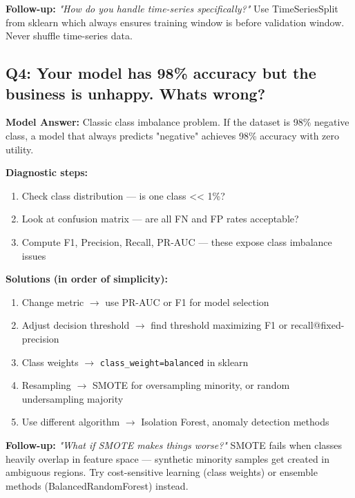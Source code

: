 \documentclass[11pt]{article}
\providecommand{\tightlist}{\setlength{\itemsep}{1pt}\setlength{\parskip}{0pt}}
\begin{document}
\textbf{Follow-up:} \emph{"How do you handle time-series specifically?"}
Use TimeSeriesSplit from sklearn which always ensures training window is before validation window. Never shuffle time-series data.

\subsection{Q4: Your model has 98\% accuracy but the business is unhappy. What\textquotesingle s wrong?}\label{q4-your-model-has-98-accuracy-but-the-business-is-unhappy-whats-wrong}

\textbf{Model Answer:}
Classic class imbalance problem. If the dataset is 98\% negative class, a model that always predicts "negative" achieves 98\% accuracy with zero utility.

\textbf{Diagnostic steps:}

\begin{enumerate}
\def\labelenumi{\arabic{enumi}.}
\tightlist
\item
  Check class distribution --- is one class \textless\textless{} 1\%?
\item
  Look at confusion matrix --- are all FN and FP rates acceptable?
\item
  Compute F1, Precision, Recall, PR-AUC --- these expose class imbalance issues
\end{enumerate}

\textbf{Solutions (in order of simplicity):}

\begin{enumerate}
\def\labelenumi{\arabic{enumi}.}
\tightlist
\item
  Change metric \(\rightarrow\) use PR-AUC or F1 for model selection
\item
  Adjust decision threshold \(\rightarrow\) find threshold maximizing F1 or recall@fixed-precision
\item
  Class weights \(\rightarrow\) \texttt{class\_weight=\textquotesingle{}balanced\textquotesingle{}} in sklearn
\item
  Resampling \(\rightarrow\) SMOTE for oversampling minority, or random undersampling majority
\item
  Use different algorithm \(\rightarrow\) Isolation Forest, anomaly detection methods
\end{enumerate}

\textbf{Follow-up:} \emph{"What if SMOTE makes things worse?"}
SMOTE fails when classes heavily overlap in feature space --- synthetic minority samples get created in ambiguous regions. Try cost-sensitive learning (class weights) or ensemble methods (BalancedRandomForest) instead.
\end{document}
